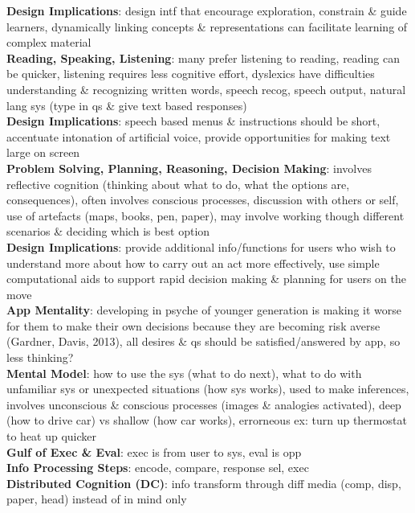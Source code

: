 \documentclass[a4paper]{article}
\begin{document}
\begin{multicols}{3}
        \textbf{Design Implications}: design intf that encourage exploration, constrain \& guide learners, dynamically linking concepts \& representations can facilitate learning of complex material\\
        \textbf{Reading, Speaking, Listening}: many prefer listening to reading, reading can be quicker, listening requires less cognitive effort, dyslexics have difficulties understanding \& recognizing written words, speech recog, speech output, natural lang sys (type in qs \& give text based responses)\\
        \textbf {Design Implications}: speech based menus \& instructions should be short, accentuate intonation of artificial voice, provide opportunities for making text large on screen\\
        \textbf{Problem Solving, Planning, Reasoning, Decision Making}: involves reflective cognition (thinking about what to do, what the options are, consequences), often involves conscious processes, discussion with others or self, use of artefacts (maps, books, pen, paper), may involve working though different scenarios \& deciding which is best option\\
        \textbf{Design Implications}: provide additional info/functions for users who wish to understand more about how to carry out an act more effectively, use simple computational aids to support rapid decision making \& planning for users on the move\\
        \textbf{App Mentality}: developing in psyche of younger generation is making it worse for them to make their own decisions because they are becoming risk averse (Gardner, Davis, 2013), all desires \& qs should be satisfied/answered by app, so less thinking?\\
        \textbf{Mental Model}: how to use the sys (what to do next), what to do with unfamiliar sys or unexpected situations (how sys works), used to make inferences, involves unconscious \& conscious processes (images \& analogies activated), deep (how to drive car) vs shallow (how car works), errorneous ex: turn up thermostat to heat up quicker\\
        \textbf{Gulf of Exec \& Eval}: exec is from user to sys, eval is opp\\
        \textbf{Info Processing Steps}: encode, compare, response sel, exec\\
        \textbf{Distributed Cognition (DC)}: info transform through diff media (comp, disp, paper, head) instead of in mind only\\

\end{multicols}
\end{document}
